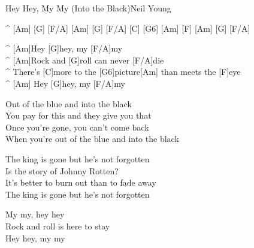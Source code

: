 \begin{song}{Hey Hey, My My (Into the Black)}{Neil Young}

\begin{guitar}
^ [Am] [G] [F/A] [Am] [G] [F/A] [C] [G6] [Am] [F] [Am] [G] [F/A]\\

\end{guitar}
\begin{guitar}
^ [Am]Hey [G]hey, my [F/A]my\\
^ [Am]Rock and [G]roll can never [F/A]die\\
^ There's [C]more to the [G6]picture[Am] than meets the [F]eye\\
^ [Am] Hey [G]hey, my [F/A]my\\
\end{guitar}


\begin{guitar}
Out of the blue and into the black\\
You pay for this and they give you that\\
Once you're gone, you can't come back\\
When you're out of the blue and into the black\\
\end{guitar}


\begin{guitar}
The king is gone but he's not forgotten\\
Is the story of Johnny Rotten?\\
It's better to burn out than to fade away\\
The king is gone but he's not forgotten\\
\end{guitar}


\begin{guitar}
My my, hey hey\\
Rock and roll is here to stay\\
Hey hey, my my\\
\end{guitar}

\end{song}
